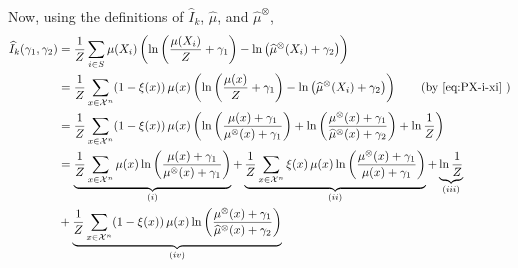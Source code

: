 %
%
Now, using the definitions of $ \widehat I_k$, $\widehat \mu$, and $\widehat \mu^{\otimes}$,
\begin{align*}
  \widehat I_k(\gamma_1, \gamma_2)
  &=
    \frac{1}{\Normfactor} \sum_{i \in S} \mu(\Sample_i) \pr{ \ln\pr{\frac{\mu(\Sample_i)}{\Normfactor} + \gamma_1
    }
    - \ln \pr{\widehat \mu^{\otimes}(\Sample_i) + \gamma_2}
    } \\
  &=
    \frac{1}{\Normfactor} \sum_{\sample \in \cX^n} (1-\xi(\sample)) \, \mu(\sample) \pr{ \ln\pr{\frac{\mu(\sample)}{\Normfactor} + \gamma_1
    }
    - \ln \pr{\widehat \mu^{\otimes}(\Sample_i) + \gamma_2}
    } \tag{by \cref{eq:PX-i-xi} }\\
  &=
    \frac{1}{\Normfactor} \sum_{\sample \in \cX^n} (1-\xi(\sample)) \, \mu(\sample) \pr{ \ln\pr{\frac{\mu(\sample) + \gamma_1}{\mu^{\otimes}(\sample) + \gamma_1}
    }
    + \ln\pr{\frac{\mu^{\otimes}(\sample) + \gamma_1}{\widehat \mu^{\otimes}(\sample) + \gamma_2}}
    + \ln\frac{1}{\Normfactor}
    }\\
    &=
      \underbrace{
      \frac{1}{\Normfactor}\sum_{\sample \in \cX^n} \mu(\sample) \ln \pr{ \frac{\mu(\sample) + \gamma_1}{\mu^{\otimes}(\sample) + \gamma_1}}
      }_{(i)}
      +
      \underbrace{
      \frac{1}{\Normfactor} \sum_{\sample \in \cX^n} \xi(\sample) \, \mu(\sample) \ln \pr{ \frac{\mu^{\otimes}(\sample) + \gamma_1}{\mu(\sample) + \gamma_1}}
      }_{(ii)}
      +
      \underbrace{
      \ln \frac{1}{\Normfactor}
      }_{(iii)}\\
      &+
        \underbrace{
        \frac{1}{\Normfactor} \sum_{\sample \in \cX^n} (1-\xi(\sample)) \, \mu(\sample)
      \ln\pr{\frac{\mu^{\otimes}(\sample) + \gamma_1}{\widehat \mu^{\otimes}(\sample) + \gamma_2}}
      }_{(iv)}
\end{align*}

